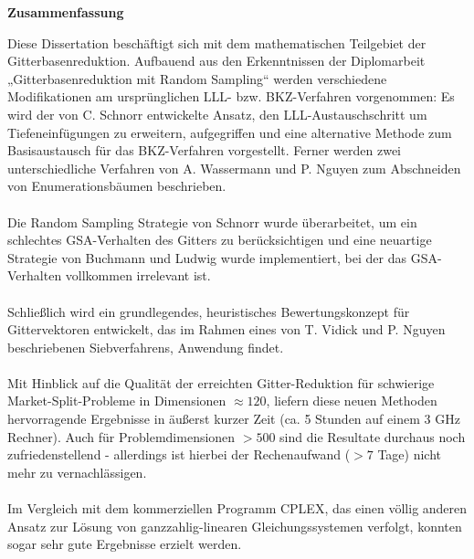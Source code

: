 \documentclass[11pt]{article}
\begin{document}
\centerline{\large \bf Zusammenfassung}
\vspace{5mm}
Diese Dissertation beschäftigt sich mit dem mathematischen Teilgebiet der Gitterbasenreduktion. Aufbauend aus den Erkenntnissen der Diplomarbeit „Gitterbasenreduktion mit Random Sampling“ werden verschiedene Modifikationen am ursprünglichen LLL- bzw. BKZ-Verfahren vorgenommen: Es wird der von C. Schnorr entwickelte Ansatz, den LLL-Austauschschritt um Tiefeneinfügungen zu erweitern, aufgegriffen und eine alternative Methode zum Basisaustausch für das BKZ-Verfahren vorgestellt. Ferner werden zwei unterschiedliche Verfahren von A. Wassermann und P. Nguyen zum Abschneiden von Enumerationsbäumen beschrieben.\\
\\
Die Random Sampling Strategie von Schnorr wurde überarbeitet, um ein schlechtes GSA-Verhalten des Gitters zu berücksichtigen und eine neuartige Strategie von Buchmann und Ludwig wurde implementiert, bei der das GSA-Verhalten vollkommen irrelevant ist.
\\
\\
Schließlich wird ein grundlegendes, heuristisches Bewertungskonzept für Gittervektoren entwickelt, das im Rahmen eines von T. Vidick und P. Nguyen beschriebenen Siebverfahrens, Anwendung findet.
\\
\\
Mit Hinblick auf die Qualität der erreichten Gitter-Reduktion für schwierige Market-Split-Probleme in Dimensionen $\approx120$, liefern diese neuen Methoden hervorragende Ergebnisse in äußerst kurzer Zeit (ca. 5 Stunden auf einem 3 GHz Rechner). Auch für Problemdimensionen $>500$ sind die Resultate durchaus noch zufriedenstellend - allerdings ist hierbei der Rechenaufwand ($>7$ Tage) nicht mehr zu vernachlässigen.\\
\\
Im Vergleich mit dem kommerziellen Programm CPLEX, das einen völlig anderen Ansatz zur Lösung von ganzzahlig-linearen Gleichungssystemen verfolgt, konnten sogar sehr gute Ergebnisse erzielt werden.
\end{document}
